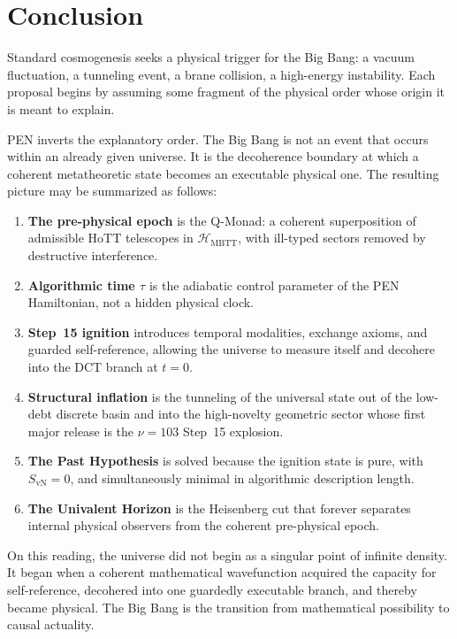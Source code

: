 \documentclass[11pt,a4paper]{article}
\theoremstyle{plain}
\theoremstyle{definition}
\theoremstyle{remark}
\newcommand{\SvN}{S_{\mathrm{vN}}}
\newcommand{\HMBTT}{\mathcal{H}_{\mathrm{MBTT}}}
\begin{document}
\section{Conclusion}
\label{sec:conclusion}

Standard cosmogenesis seeks a physical trigger for the Big Bang: a vacuum fluctuation, a tunneling event, a brane collision, a high-energy instability.
Each proposal begins by assuming some fragment of the physical order whose origin it is meant to explain.

PEN inverts the explanatory order.
The Big Bang is not an event that occurs within an already given universe.
It is the decoherence boundary at which a coherent metatheoretic state becomes an executable physical one.
The resulting picture may be summarized as follows:
\begin{enumerate}[nosep]
    \item \textbf{The pre-physical epoch} is the Q-Monad: a coherent superposition of admissible HoTT telescopes in $\HMBTT$, with ill-typed sectors removed by destructive interference.
    \item \textbf{Algorithmic time $\tau$} is the adiabatic control parameter of the PEN Hamiltonian, not a hidden physical clock.
    \item \textbf{Step~15 ignition} introduces temporal modalities, exchange axioms, and guarded self-reference, allowing the universe to measure itself and decohere into the DCT branch at $t = 0$.
    \item \textbf{Structural inflation} is the tunneling of the universal state out of the low-debt discrete basin and into the high-novelty geometric sector whose first major release is the $\nu = 103$ Step~15 explosion.
    \item \textbf{The Past Hypothesis} is solved because the ignition state is pure, with $\SvN = 0$, and simultaneously minimal in algorithmic description length.
    \item \textbf{The Univalent Horizon} is the Heisenberg cut that forever separates internal physical observers from the coherent pre-physical epoch.
\end{enumerate}

On this reading, the universe did not begin as a singular point of infinite density.
It began when a coherent mathematical wavefunction acquired the capacity for self-reference, decohered into one guardedly executable branch, and thereby became physical.
The Big Bang is the transition from mathematical possibility to causal actuality.
\end{document}

